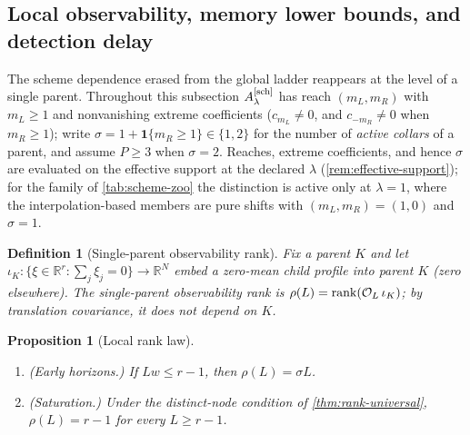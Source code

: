 \documentclass[pdflatex,sn-mathphys-num]{sn-jnl}%
\theoremstyle{thmstyleone}%
\newtheorem{proposition}{Proposition}%
\theoremstyle{thmstyletwo}%
\theoremstyle{thmstylethree}%
\newtheorem{definition}{Definition}%
\newcommand{\R}{\mathbb R}
\DeclareMathOperator{\rank}{rank}
\newcommand{\OL}{{\cal O}_L}
\newcommand{\Asch}{A^{[\rm sch]}_\lambda}
\begin{document}
\subsection{Local observability, memory lower bounds, and detection delay}\label{sec:local}

The scheme dependence erased from the global ladder reappears at the level of a single parent.
Throughout this subsection $\Asch$ has reach $(m_L,m_R)$ with $m_L\ge1$ and nonvanishing extreme coefficients ($c_{m_L}\ne0$, and $c_{-m_R}\ne0$ when $m_R\ge1$); write $\sigma=1+\mathbf 1\{m_R\ge1\}\in\{1,2\}$ for the number of \emph{active collars} of a parent, and assume $P\ge3$ when $\sigma=2$.
Reaches, extreme coefficients, and hence $\sigma$ are evaluated on the effective support at the declared $\lambda$ (\cref{rem:effective-support}); for the family of \cref{tab:scheme-zoo} the distinction is active only at $\lambda=1$, where the interpolation-based members are pure shifts with $(m_L,m_R)=(1,0)$ and $\sigma=1$.

\begin{definition}[Single-parent observability rank]\label{def:local-rank}
Fix a parent $K$ and let $\iota_K:\{\xi\in\R^r:\sum_j\xi_j=0\}\to\R^{N}$ embed a zero-mean child profile into parent $K$ (zero elsewhere).
The single-parent observability rank is $\rho(L)=\rank(\OL\,\iota_K)$; by translation covariance, it does not depend on $K$.
\end{definition}

\begin{proposition}[Local rank law]\label{prop:local-rank}
\begin{enumerate}
\item[(i)] (\emph{Early horizons.})
If $Lw\le r-1$, then $\rho(L)=\sigma L$.
\item[(ii)] (\emph{Saturation.})
Under the distinct-node condition of \cref{thm:rank-universal}, $\rho(L)=r-1$ for every $L\ge r-1$.
\end{enumerate}
\end{proposition}
\end{document}
